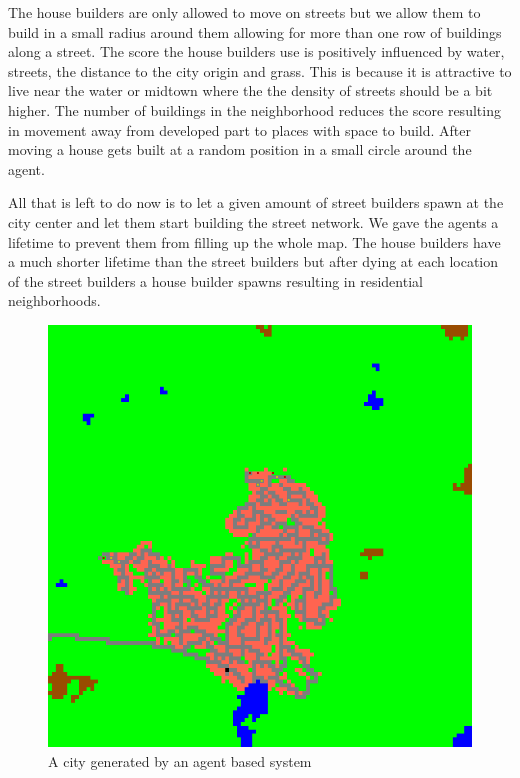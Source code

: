 \documentclass{scrartcl}
\begin{document}
The house builders are only allowed to move on streets but we allow them to build
in a small radius around them allowing for more than one row of buildings along a street.
The score the house builders use is positively influenced by water, streets, the
distance to the city origin and grass. This is because it is attractive to live
near the water or midtown where the the density of streets should be a bit higher.
The number of buildings in the neighborhood reduces the score resulting in movement
away from developed part to places with space to build. After moving a house gets built
at a random position in a small circle around the agent.

All that is left to do now is to let a given amount of street builders spawn at the
city center and let them start  building the street network. We gave the agents
a lifetime to prevent them from filling up the whole map. The house builders
have a much shorter lifetime than the street builders but after dying at each location
of the street builders a house builder spawns resulting in residential neighborhoods.

\begin{figure}
  \centering
  \includegraphics[scale = 0.2]{city}
  \caption{A city generated by an agent based system}
\end{figure}
\end{document}
